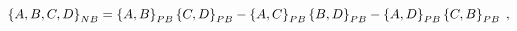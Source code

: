 \begin{equation}
\left\{  A,B,C,D\right\}  _{{\footnotesize NB}}=\left\{  A,B\right\}
_{{\footnotesize PB}}\left\{  C,D\right\}  _{{\footnotesize PB}}-\left\{
A,C\right\}  _{{\footnotesize PB}}\left\{  B,D\right\}  _{{\footnotesize PB}%
}-\left\{  A,D\right\}  _{{\footnotesize PB}}\left\{  C,B\right\}
_{{\footnotesize PB}}\;,
\end{equation}

